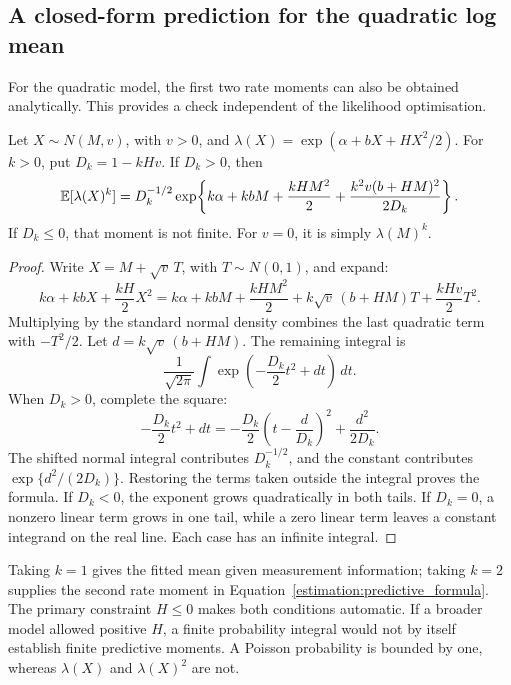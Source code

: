 \subsection{A closed-form prediction for the quadratic log mean}

For the quadratic model, the first two rate moments can also be obtained
analytically. This provides a check independent of the likelihood
optimisation.

\begin{proposition}
\label{estimation:closed_prediction}
Let \(X\sim N(M,v)\), with \(v>0\), and
\(\lambda(X)=\exp(\alpha+bX+HX^2/2)\). For \(k>0\), put
\(D_k=1-kHv\). If \(D_k>0\), then
\begin{equation}
 \mathbb E[\lambda(X)^k]
 =D_k^{-1/2}
   \exp\!\left\{
     k\alpha+kbM+\frac{kHM^2}{2}
     +\frac{k^2v(b+HM)^2}{2D_k}
   \right\}.
 \label{estimation:rate_moments}
\end{equation}
If \(D_k\leq0\), that moment is not finite. For \(v=0\), it is simply
\(\lambda(M)^k\).
\end{proposition}

\begin{proof}
Write \(X=M+\sqrt v\,T\), with \(T\sim N(0,1)\), and expand:
\[
 k\alpha+kbX+\frac{kH}{2}X^2
 =k\alpha+kbM+\frac{kHM^2}{2}
   +k\sqrt v\,(b+HM)T+\frac{kHv}{2}T^2.
\]
Multiplying by the standard normal density combines the last quadratic term
with \(-T^2/2\). Let \(d=k\sqrt v\,(b+HM)\). The remaining integral is
\[
 \frac1{\sqrt{2\pi}}\int
   \exp\!\left(-\frac{D_k}{2}t^2+dt\right)\,dt.
\]
When \(D_k>0\), complete the square:
\[
 -\frac{D_k}{2}t^2+dt
 =-\frac{D_k}{2}\left(t-\frac d{D_k}\right)^2
   +\frac{d^2}{2D_k}.
\]
The shifted normal integral contributes \(D_k^{-1/2}\), and the constant
contributes \(\exp\{d^2/(2D_k)\}\). Restoring the terms taken outside the
integral proves the formula. If \(D_k<0\), the exponent grows quadratically
in both tails. If \(D_k=0\), a nonzero linear term grows in one tail, while a
zero linear term leaves a constant integrand on the real line. Each case
has an infinite integral.
\end{proof}

Taking \(k=1\) gives the fitted mean given measurement information; taking
\(k=2\) supplies the second rate moment in
Equation~\eqref{estimation:predictive_formula}. The primary constraint
\(H\leq0\) makes both conditions automatic. If a broader model allowed
positive \(H\), a finite probability integral would not by itself establish
finite predictive moments. A Poisson probability is bounded by one, whereas
\(\lambda(X)\) and \(\lambda(X)^2\) are not.

